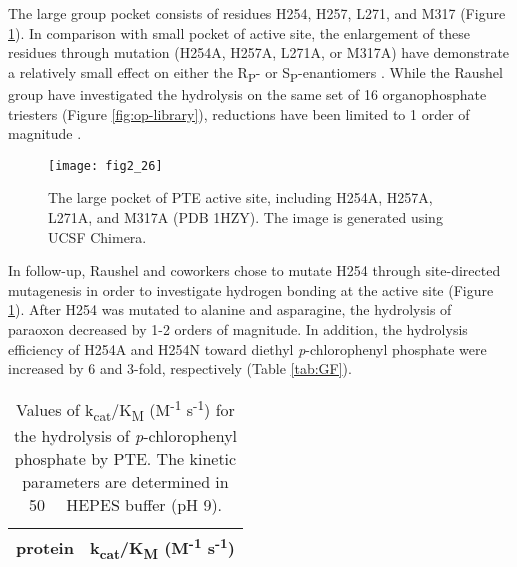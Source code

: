 \begin{refsection}
The large group pocket consists of residues H254, H257, L271, and M317
\cite{Hanusa2011} (Figure \ref{fig:large-pocket}). In comparison with small
pocket of active site, the enlargement of these residues through mutation
(H254A, H257A, L271A, or M317A) have demonstrate a relatively small effect on
either the R\textsubscript{P}- or S\textsubscript{P}-enantiomers
\cite{Chen-Goodspeed2001a}. While the Raushel group have investigated the
hydrolysis on the same set of 16 organophosphate triesters (Figure
\ref{fig:op-library}), reductions have been limited to 1 order of magnitude
\cite{Chen-Goodspeed2001a}.
\begin{figure}[htbp] \centering \texttt{[image: fig2\_26]}
    \caption[The large pocket of PTE active site, including H254A, H257A,
    L271A, and M317A (PDB 1HZY). The image is generated using UCSF Chimera.]
    {The large pocket of PTE active site, including H254A, H257A, L271A, and
        M317A (PDB 1HZY). The image is generated using UCSF Chimera.}
    \label{fig:large-pocket}
\end{figure}

In follow-up, Raushel and coworkers chose to mutate H254 through site-directed
mutagenesis in order to investigate hydrogen bonding at the active site
\cite{Aubert2004b} (Figure \ref{fig:large-pocket}). After H254 was mutated to
alanine and asparagine, the hydrolysis of paraoxon decreased by 1-2 orders of
magnitude. In addition, the hydrolysis efficiency of H254A and H254N
toward diethyl \emph{p}-chlorophenyl phosphate were increased by 6 and 3-fold,
respectively (Table \ref{tab:GF}).
\begin{table}[htbp]
    \centering
    \caption[Values of k\textsubscript{cat}/K\textsubscript{M}
        (M\textsuperscript{-1} s\textsuperscript{-1}) for the hydrolysis of
    \emph{p}-chlorophenyl phosphate by PTE. The kinetic parameters are
determined in \SI{50}{\milli\Molar} HEPES buffer (pH 9).] {Values of
    k\textsubscript{cat}/K\textsubscript{M} (M\textsuperscript{-1}
    s\textsuperscript{-1}) for the hydrolysis of \emph{p}-chlorophenyl
    phosphate by PTE. The kinetic parameters are determined in
    \SI{50}{\milli\Molar} HEPES buffer (pH 9).}
    \begin{tabular}{ll}
    \hline

    protein & k\textsubscript{cat}/K\textsubscript{M} (M\textsuperscript{-1}
    s\textsuperscript{-1})  \\ 
    \hline


\end{tabular}
\end{table}
\end{refsection}
